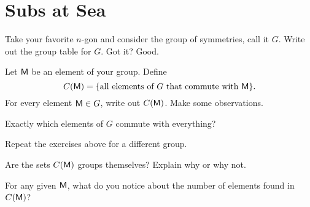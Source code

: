 \newpage
\section{Subs at Sea}

Take your favorite $n$-gon and consider the group of symmetries, call it $G$. Write out the group table for $G$. Got it? Good.

\begin{prob} Let $\mathsf{M}$ be an element of your group. Define
\[
C(\mathsf{M}) = \{\text{all elements of $G$ that commute with $\mathsf{M}$}\}.
\]
For every element $\mathsf{M}\in G$, write out $C(\mathsf{M})$. Make some
observations.
\end{prob}

\begin{prob}
Exactly which elements of $G$ commute with everything?
\end{prob}

\begin{prob}
Repeat the exercises above for a different group.
\end{prob}

\begin{prob}
Are the sets $C(\mathsf{M})$ groups themselves? Explain why or why not.
\end{prob}

\begin{prob}
For any given $\mathsf{M}$, what do you notice about the number of
elements found in $C(\mathsf{M})$?
\end{prob}


